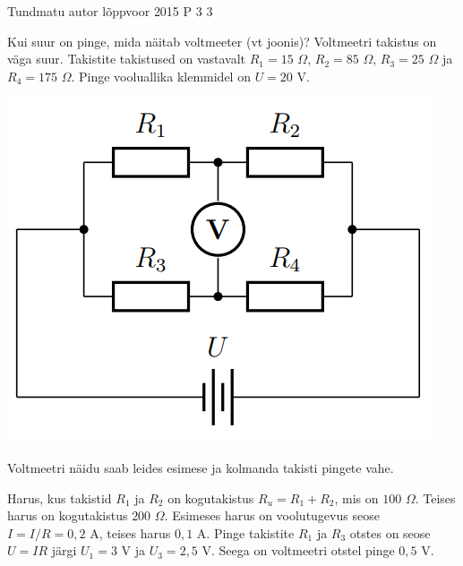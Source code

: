 {Tundmatu autor} %
{lõppvoor} %
{2015} %
{P 3} %
{3} %
{

\ifStatement
 Kui suur on pinge, mida näitab voltmeeter (vt joonis)? Voltmeetri takistus on väga suur. Takistite takistused on vastavalt $R_1 = 15$ $\Omega$, $R_2 = 85$ $\Omega$, $R_3 = 25$ $\Omega$ ja $R_4 = 175$ $\Omega$. Pinge vooluallika klemmidel on $U = 20$ V.
\begin{center}
	\includegraphics[width=0.5\linewidth]{2015-v3p-03-yl.png}
\end{center}
\fi

\ifHint
Voltmeetri näidu saab leides esimese ja kolmanda takisti pingete vahe.
\fi

\ifSolution
Harus, kus takistid $R_1$ ja $R_2$ on kogutakistus $R_u = R_1 + R_2$, mis on $100$ $\Omega$. Teises harus on kogutakistus $200$ $\Omega$. Esimeses harus on voolutugevus seose $I = I/R = 0,2$ A, teises harus $0,1$ A.
Pinge takistite $R_1$ ja $R_3$ otstes on seose $U = I R$ järgi $U_1 = 3$ V ja $U_3 = 2,5$ V. Seega on voltmeetri otstel pinge $0,5$ V.
\fi
}